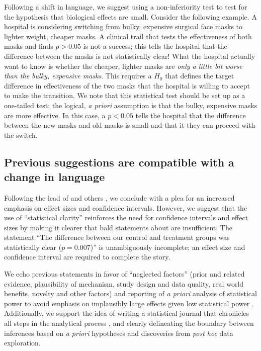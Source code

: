 Following a shift in language, we suggest using a non-inferiority test to test for the hypothesis that biological effects are small. Consider the following example. A hospital is considering switching from bulky, expensive surgical face masks to lighter weight, cheaper masks. A clinical trail that tests the effectiveness of both masks and finds $p > 0.05$ is not a success; this tells the hospital that the difference between the masks is not statistically clear! What the hospital actually want to know is whether the cheaper, lighter masks are \emph{only a little bit worse than the bulky, expensive masks}. This requires a $H_{0}$ that defines the target difference in effectiveness of the two masks that the hospital is willing to accept to make the transition. We note that this statistical test should be set up as a one-tailed test; the logical, \emph{a priori} assumption is that the bulky, expensive masks are more effective. In this case, a $p < 0.05$ tells the hospital that the difference between the new masks and old masks is small and that it they can proceed with the switch.

\subsection*{Previous suggestions are compatible with a change in language}

Following the lead of \citet{Cohen1994} and others \citep{Goodman1999, ZiliakandMcCloskey2008, WassersteinandLazar2016}, we conclude with a plea for an increased emphasis on effect sizes and confidence intervals. However, we suggest that the use of ``statistical clarity'' reinforces the need for confidence intervals and effect sizes by making it clearer that bald statements about \pvals are insufficient. The statement ``The difference between our control and treatment groups was statistically clear ($p = 0.007$)'' is unambiguously incomplete; an effect size and confidence interval are required to complete the story.

We echo previous statements in favor of ``neglected factors'' (prior and related evidence, plausibility of mechanism, study design and data quality, real world benefits, novelty and other factors) \citep{McShaneetal.2017} and reporting of \emph{a priori} analysis of statistical power to avoid emphasis on implausibly large effects given low statistical power \citep[the ``winner's curse''][]{GelmanandCarlin2014, SzucsandIoannidis2017, Bernardietal.2017}.  Additionally, we support the idea of writing a statistical journal that chronicles all steps in the analytical process \citep{Kassetal.2016}, and clearly delineating the boundary between inferences based on \emph{a priori} hypotheses and discoveries from \emph{post hoc} data exploration.

